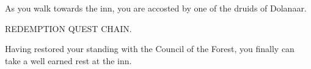 As you walk towards the inn, you are accosted by one of the druids of Dolanaar.


REDEMPTION QUEST CHAIN.

Having restored your standing with the Council of the Forest, you finally can take a well earned rest at the inn.
